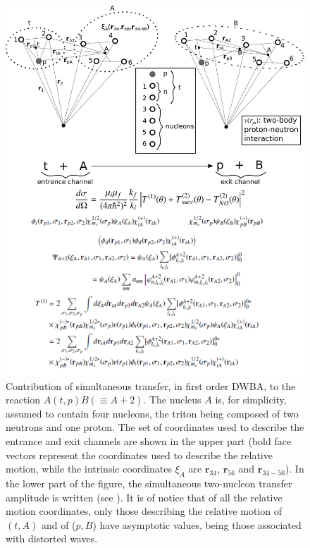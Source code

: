 \begin{figure}
\centerline{\includegraphics*[width=\textwidth,angle=0]{nutshell/figs/fig_alpha.pdf}}
\caption{
	 Contribution of simultaneous transfer, in first order DWBA, to the reaction $A(t,p)B(\equiv A+2)$. The nucleus $A$ is, for simplicity, assumed to contain four nucleons, the triton being composed of two neutrons and one proton. The set of coordinates used to describe the entrance and exit channels are shown in the upper part (bold face vectors represent the coordinates used to describe the relative motion, while the intrinsic coordinates $\xi_A$ are $\mathbf r_{34}$, $\mathbf r_{56}$ and $\mathbf r_{34-56}$). In the lower part of the figure, the simultaneous two-nucleon transfer amplitude is written (see \cite{Potel:13b}). It is of notice that of all the relative motion coordinates, only those describing the relative motion of $(t,A)$ and of ($p,B$) have asymptotic values, being those associated with distorted waves.}\label{fig_alpha}
\end{figure}
